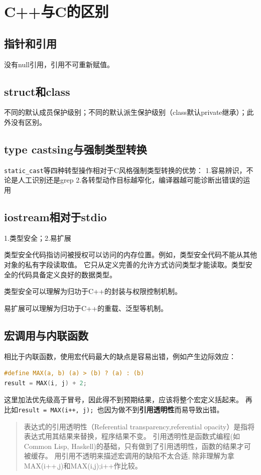 
\section{C++与C的区别}



\subsection{指针和引用}
没有null引用，引用不可重新赋值。

\subsection{struct和class}
不同的默认成员保护级别；不同的默认派生保护级别（class默认private继承）；此外没有区别。

\subsection{type castsing与强制类型转换}
\verb|static_cast|等四种转型操作相对于C风格强制类型转换的优势：
1.容易辨识，不论是人工识别还是grep
2.各转型动作目标越窄化，编译器越可能诊断出错误的运用

\subsection{iostream相对于stdio}
1.类型安全；2.易扩展

类型安全代码指访问被授权可以访问的内存位置。例如，类型安全代码不能从其他对象的私有字段读取值。
它只从定义完善的允许方式访问类型才能读取。类型安全的代码具备定义良好的数据类型。

类型安全可以理解为归功于C++的封装与权限控制机制。

易扩展可以理解为归功于C++的重载、泛型等机制。

\subsection{宏调用与内联函数}
相比于内联函数，使用宏代码最大的缺点是容易出错，例如产生边际效应：
\begin{lstlisting}[language=C]
#define MAX(a, b) (a) > (b) ? (a) : (b) 
result = MAX(i, j) + 2;
\end{lstlisting}
这里加法优先级高于冒号，因此得不到预期结果，应该将整个宏定义括起来。
再比如\verb$result = MAX(i++, j); $也因为做不到\textbf{引用透明性}而易导致出错。

\begin{quotation}
表达式的引用透明性（Referential transparency,referential opacity）是指将表达式用其结果来替换，程序结果不变。
引用透明性是函数式编程(如Common Lisp, Haskell)的基础，只有做到了引用透明性，函数的结果才可被缓存。
用引用不透明来描述宏调用的缺陷不太合适, 除非理解为拿MAX(i++,j)和{MAX(i,j);i++}作比较。
\end{quotation}

